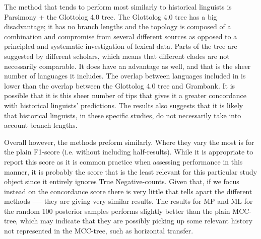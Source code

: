 \documentclass[a4paper,10pt]{article} %
\begin{document}
The method that tends to perform most similarly to historical linguists is Parsimony + the Glottolog 4.0 tree. The Glottolog 4.0 tree has a big disadvantage; it has no branch lengths and the topology is composed of a combination and compromise from several different sources as opposed to a principled and systematic investigation of lexical data. Parts of the tree are suggested by different scholars, which means that different clades are not necessarily comparable. It does have an advantage as well, and that is the sheer number of languages it includes. The overlap between languages included in \citet{grayetal_2009} is lower than the overlap between the Glottolog 4.0 tree and Grambank. It is possible that it is this sheer number of tips that gives it a greater concordance with historical linguists' predictions. The results also suggests that it is likely that historical linguists, in these specific studies, do not necessarily take into account branch lengths. 

Overall however, the methods preform similarly. Where they vary the most is for the plain F1-score (i.e. without including half-results). While it is appropriate to report this score as it is common practice when assessing performance in this manner, it is probably the score that is the least relevant for this particular study object since it entirely ignores True Negative-counts. Given that, if we focus instead on the concordance score there is very little that tells apart the different methods ---- they are giving very similar results. The results for MP and ML for the random 100 posterior samples performs slightly better than the plain MCC-tree, which may indicate that they are possibly picking up some relevant history not represented in the MCC-tree, such as horizontal transfer.

\end{document}
